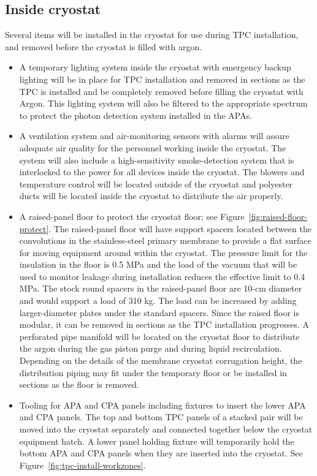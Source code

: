 \subsection{Inside cryostat}
\label{fd:install:tempeqp:inside}

Several items will be installed in the cryostat for use during TPC installation, and removed before the cryostat is filled with argon. 
\begin{itemize}
\item A temporary lighting system inside the cryostat with emergency backup lighting will be in place for TPC installation and removed in sections as the TPC is installed and be completely removed before filling the cryostat with Argon. This lighting system will also be filtered to the appropriate spectrum to protect the photon detection system installed in the APAs.  
\item A ventilation system and air-monitoring sensors with alarms will assure adequate air quality for the personnel working inside the cryostat. The system will also include a high-sensitivity smoke-detection system that is interlocked to the power for all devices inside the cryostat. The blowers and temperature control will be located outside of the cryostat and polyester ducts will be located inside the cryostat to distribute the air properly. 
\item A raised-panel floor to protect the cryostat floor; see Figure~\ref{fig:raised-floor-protect}. The raised-panel floor will have support spacers located between the convolutions in the stainless-steel primary membrane to provide a flat surface for moving equipment around within the cryostat. The pressure limit for the insulation in the floor is 0.5 MPa and the load of the vacuum that will be used to monitor leakage during installation reduces the effective limit to 0.4 MPa. The stock round spacers in the raised-panel floor are 10-cm diameter and would support a load of 310 kg. The load can be increased by adding larger-diameter plates under the standard spacers. Since the raised floor is modular, it can be removed in sections as the TPC installation progresses. A perforated pipe manifold will be located on the cryostat floor to distribute the argon during the gas piston purge and during liquid recirculation. Depending on the details of the membrane cryostat corrugation height, the distribution piping may fit under the temporary floor or be installed in sections as the floor is removed. 
\item Tooling for APA and CPA panels including fixtures to insert the lower APA and CPA panels. The top and bottom TPC panels of a stacked pair will be moved into the cryostat separately and connected together below the cryostat equipment hatch. A lower panel holding fixture will temporarily hold the bottom APA and CPA panels when they are inserted into the cryostat. See Figure~\ref{fig:tpc-install-workzones}. 

\end{itemize}
